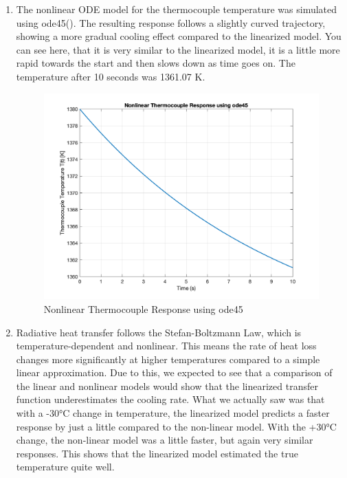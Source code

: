 \documentclass[12pt]{article}
\begin{document}
\begin{enumerate}
\begin{enumerate}
    \item
    The nonlinear ODE model for the thermocouple temperature was simulated using ode45(). The resulting response follows a slightly curved trajectory, showing a more gradual cooling effect compared to the linearized model. You can see here, that it is very similar to the linearized model, it is a little more rapid towards the start and then slows down as time goes on.
    The temperature after 10 seconds was 1361.07 K.

    \begin{figure}[H]
      \centering
      \includegraphics[width=1\textwidth]{Figures/figure2-3.png}
      \caption{Nonlinear Thermocouple Response using ode45}
      \label{fig:figure23} 
    \end{figure}

    \item
    Radiative heat transfer follows the Stefan-Boltzmann Law, which is temperature-dependent and nonlinear. This means the rate of heat loss changes more significantly at higher temperatures compared to a simple linear approximation. Due to this, we expected to see that a comparison of the linear and nonlinear models would show that the linearized transfer function underestimates the cooling rate. What we actually saw was that with a -30°C change in temperature, the linearized model predicts a faster response by just a little compared to the non-linear model. With the +30°C change, the non-linear model was a little faster, but again very similar responses. This shows that the linearized model estimated the true temperature quite well. 


\end{enumerate}
\end{enumerate}
\end{document}
